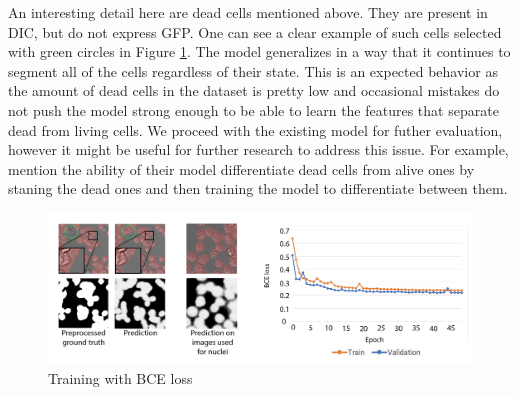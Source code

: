 An interesting detail here are dead cells mentioned above. They are present in DIC, but do not express GFP. One can see a clear example of such cells selected with green circles in Figure \ref{fig:gfp-bce-predictions}. The model generalizes in a way that it continues to segment all of the cells regardless of their state. This is an expected behavior as the amount of dead cells in the dataset is pretty low and occasional mistakes do not push the model strong enough to be able to learn the features that separate dead from living cells. We proceed with the existing model for futher evaluation, however it might be useful for further research to address this issue. For example, \cite{Christiansen_2018} mention the ability of their model differentiate dead cells from alive ones by staning the dead ones and then training the model to differentiate between them. 

\begin{figure}[H]
	\begin{center}
		\includegraphics[width=0.8\linewidth]{bilder/gfp/binary-bce/enlarged.png}
		\caption{Training with BCE loss}\label{fig:gfp-bce-predictions}
	\end{center}
\end{figure}
